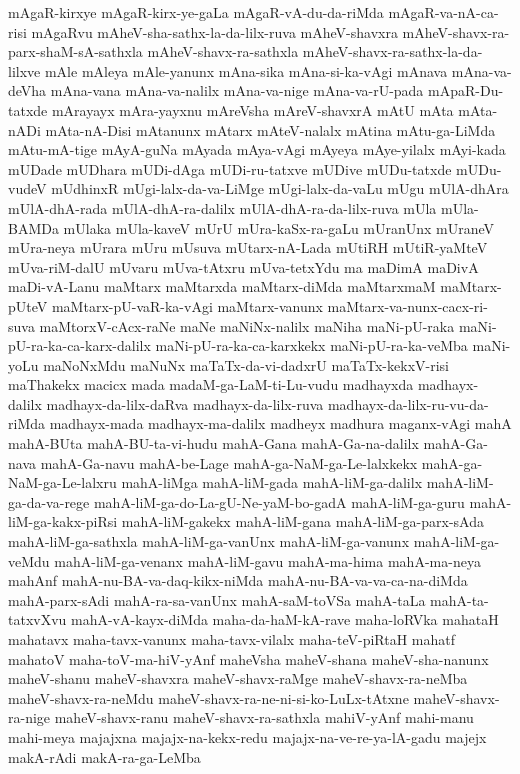 {mAgaR-kirxye
mAgaR-kirx-ye-gaLa
mAgaR-vA-du-da-riMda
mAgaR-va-nA-ca-risi
mAgaRvu
mAheV-sha-sathx-la-da-lilx-ruva
mAheV-shavxra
mAheV-shavx-ra-parx-shaM-sA-sathxla
mAheV-shavx-ra-sathxla
mAheV-shavx-ra-sathx-la-da-lilxve
mAle
mAleya
mAle-yanunx
mAna-sika
mAna-si-ka-vAgi
mAnava
mAna-va-deVha
mAna-vana
mAna-va-nalilx
mAna-va-nige
mAna-va-rU-pada
mApaR-Du-tatxde
mArayayx
mAra-yayxnu
mAreVsha
mAreV-shavxrA
mAtU
mAta
mAta-nADi
mAta-nA-Disi
mAtanunx
mAtarx
mAteV-nalalx
mAtina
mAtu-ga-LiMda
mAtu-mA-tige
mAyA-guNa
mAyada
mAya-vAgi
mAyeya
mAye-yilalx
mAyi-kada
mUDade
mUDhara
mUDi-dAga
mUDi-ru-tatxve
mUDive
mUDu-tatxde
mUDu-vudeV
mUdhinxR
mUgi-lalx-da-va-LiMge
mUgi-lalx-da-vaLu
mUgu
mUlA-dhAra
mUlA-dhA-rada
mUlA-dhA-ra-dalilx
mUlA-dhA-ra-da-lilx-ruva
mUla
mUla-BAMDa
mUlaka
mUla-kaveV
mUrU
mUra-kaSx-ra-gaLu
mUranUnx
mUraneV
mUra-neya
mUrara
mUru
mUsuva
mUtarx-nA-Lada
mUtiRH
mUtiR-yaMteV
mUva-riM-dalU
mUvaru
mUva-tAtxru
mUva-tetxYdu
ma
maDimA
maDivA
maDi-vA-Lanu
maMtarx
maMtarxda
maMtarx-diMda
maMtarxmaM
maMtarx-pUteV
maMtarx-pU-vaR-ka-vAgi
maMtarx-vanunx
maMtarx-va-nunx-cacx-ri-suva
maMtorxV-cAcx-raNe
maNe
maNiNx-nalilx
maNiha
maNi-pU-raka
maNi-pU-ra-ka-ca-karx-dalilx
maNi-pU-ra-ka-ca-karxkekx
maNi-pU-ra-ka-veMba
maNi-yoLu
maNoNxMdu
maNuNx
maTaTx-da-vi-dadxrU
maTaTx-kekxV-risi
maThakekx
macicx
mada
madaM-ga-LaM-ti-Lu-vudu
madhayxda
madhayx-dalilx
madhayx-da-lilx-daRva
madhayx-da-lilx-ruva
madhayx-da-lilx-ru-vu-da-riMda
madhayx-mada
madhayx-ma-dalilx
madheyx
madhura
maganx-vAgi
mahA
mahA-BUta
mahA-BU-ta-vi-hudu
mahA-Gana
mahA-Ga-na-dalilx
mahA-Ga-nava
mahA-Ga-navu
mahA-be-Lage
mahA-ga-NaM-ga-Le-lalxkekx
mahA-ga-NaM-ga-Le-lalxru
mahA-liMga
mahA-liM-gada
mahA-liM-ga-dalilx
mahA-liM-ga-da-va-rege
mahA-liM-ga-do-La-gU-Ne-yaM-bo-gadA
mahA-liM-ga-guru
mahA-liM-ga-kakx-piRsi
mahA-liM-gakekx
mahA-liM-gana
mahA-liM-ga-parx-sAda
mahA-liM-ga-sathxla
mahA-liM-ga-vanUnx
mahA-liM-ga-vanunx
mahA-liM-ga-veMdu
mahA-liM-ga-venanx
mahA-liM-gavu
mahA-ma-hima
mahA-ma-neya
mahAnf
mahA-nu-BA-va-daq-kikx-niMda
mahA-nu-BA-va-va-ca-na-diMda
mahA-parx-sAdi
mahA-ra-sa-vanUnx
mahA-saM-toVSa
mahA-taLa
mahA-ta-tatxvXvu
mahA-vA-kayx-diMda
maha-da-haM-kA-rave
maha-loRVka
mahataH
mahatavx
maha-tavx-vanunx
maha-tavx-vilalx
maha-teV-piRtaH
mahatf
mahatoV
maha-toV-ma-hiV-yAnf
maheVsha
maheV-shana
maheV-sha-nanunx
maheV-shanu
maheV-shavxra
maheV-shavx-raMge
maheV-shavx-ra-neMba
maheV-shavx-ra-neMdu
maheV-shavx-ra-ne-ni-si-ko-LuLx-tAtxne
maheV-shavx-ra-nige
maheV-shavx-ranu
maheV-shavx-ra-sathxla
mahiV-yAnf
mahi-manu
mahi-meya
majajxna
majajx-na-kekx-redu
majajx-na-ve-re-ya-lA-gadu
majejx
makA-rAdi
makA-ra-ga-LeMba
}

